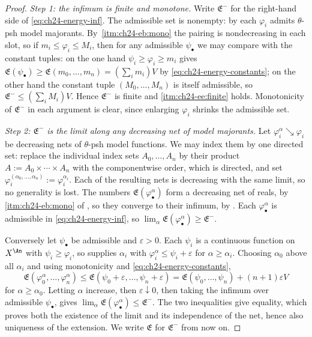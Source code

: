 \begin{proof}
\emph{Step 1: the infimum is finite and monotone.}  Write $\mathfrak E^-$
for the right-hand side of \eqref{eq:ch24-energy-inf}.  The admissible set is
nonempty: by  each $\varphi_i$
admits $\theta$-psh model majorants.  By
\,\cref{itm:ch24-eb:mono} the pairing is
nondecreasing in each slot, so if $m_i\leq\varphi_i\leq M_i$, then for any
admissible $\psi_\bullet$ we may compare with the constant tuples: on the
one hand $\psi_i\geq\varphi_i\geq m_i$ gives
$\mathfrak E(\psi_\bullet)\geq\mathfrak E(m_0,\ldots,m_n)
 =(\sum_im_i)V$ by \eqref{eq:ch24-energy-constants}; on the other hand the
constant tuple $(M_0,\ldots,M_n)$ is itself admissible, so
$\mathfrak E^-\leq(\sum_iM_i)V$.  Hence $\mathfrak E^-$ is finite and
\cref{itm:ch24-ee:finite} holds.  Monotonicity of $\mathfrak E^-$ in each
argument is clear, since enlarging $\varphi_i$ shrinks the admissible set.

\emph{Step 2: $\mathfrak E^-$ is the limit along any decreasing net of
model majorants.}  Let $\varphi_i^\alpha\searrow\varphi_i$ be decreasing
nets of $\theta$-psh model functions.  We may index them by one directed
set: replace the individual index sets $A_0,\ldots,A_n$ by their product
$A:=A_0\times\cdots\times A_n$ with the componentwise order, which is
directed, and set $\varphi_i^{(\alpha_0,\ldots,\alpha_n)}
:=\varphi_i^{\alpha_i}$.  Each of the resulting nets is decreasing with the
same limit, so no generality is lost.  The
numbers $\mathfrak E(\varphi_\bullet^\alpha)$ form a decreasing net of
reals, by \cref{itm:ch24-eb:mono} of , so they
converge to their infimum, by .  Each
$\varphi_\bullet^\alpha$ is admissible in \eqref{eq:ch24-energy-inf}, so
$\lim_\alpha\mathfrak E(\varphi^\alpha_\bullet)\geq\mathfrak E^-$.

Conversely let $\psi_\bullet$ be admissible and $\varepsilon>0$.  Each
$\psi_i$ is a continuous function on $X^{\An}$ with
$\psi_i\geq\varphi_i$, so  supplies
$\alpha_i$ with $\varphi_i^\alpha\leq\psi_i+\varepsilon$ for
$\alpha\geq\alpha_i$.  Choosing $\alpha_0$ above all $\alpha_i$ and
using monotonicity and \eqref{eq:ch24-energy-constants},
\[
 \mathfrak E(\varphi^\alpha_0,\ldots,\varphi^\alpha_n)
 \leq\mathfrak E(\psi_0+\varepsilon,\ldots,\psi_n+\varepsilon)
 =\mathfrak E(\psi_0,\ldots,\psi_n)+(n+1)\varepsilon V
\]
for $\alpha\geq\alpha_0$.  Letting $\alpha$ increase, then
$\varepsilon\downarrow0$, then taking the infimum over admissible
$\psi_\bullet$, gives
$\lim_\alpha\mathfrak E(\varphi^\alpha_\bullet)\leq\mathfrak E^-$.  The two
inequalities give equality, which proves both the existence of the limit and
its independence of the net, hence also uniqueness of the extension.  We
write $\mathfrak E$ for $\mathfrak E^-$ from now on.


\end{proof}
